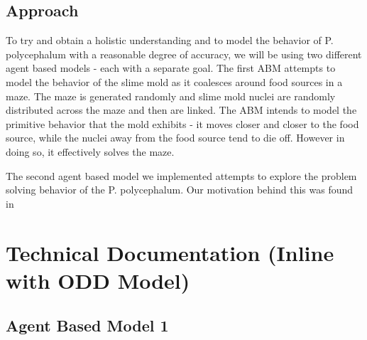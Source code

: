 \documentclass[a4paper, 11pt]{article}
\begin{document}
\subsection{Approach}

To try and obtain a holistic understanding and to model the behavior of P. polycephalum with a reasonable degree of accuracy, we will be using two different agent based models - each with a separate goal. The first ABM attempts to model the behavior of the slime mold as it coalesces around food sources in a maze. The maze is generated randomly and slime mold nuclei are randomly distributed across the maze and then are linked. The ABM intends to model the primitive behavior that the mold exhibits - it moves closer and closer to the food source, while the nuclei away from the food source tend to die off. However in doing so, it effectively solves the maze. 

The second agent based model we implemented attempts to explore the problem solving behavior of the P. polycephalum. Our motivation behind this was found in     
\newpage
\section {Technical Documentation (Inline with ODD Model)}
\subsection{Agent Based Model 1}
\end{document}
